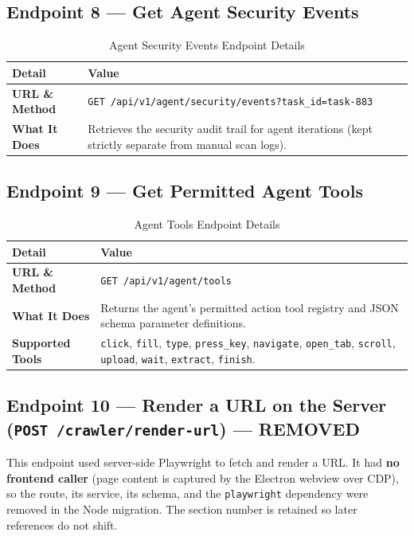 \documentclass[11pt,a4paper]{article}
\begin{document}
\subsection{Endpoint 8 --- Get Agent Security Events}
\begin{table}[H]
\centering
\small
\begin{tabularx}{\textwidth}{BX}
\toprule
\textbf{Detail} & \textbf{Value} \\
\midrule
\textbf{URL \& Method} & \texttt{GET /api/v1/agent/security/events?task\_id=task-883} \\
\textbf{What It Does} & Retrieves the security audit trail for agent iterations (kept strictly separate from manual scan logs). \\
\bottomrule
\end{tabularx}
\caption{Agent Security Events Endpoint Details}
\end{table}

\subsection{Endpoint 9 --- Get Permitted Agent Tools}
\begin{table}[H]
\centering
\small
\begin{tabularx}{\textwidth}{BX}
\toprule
\textbf{Detail} & \textbf{Value} \\
\midrule
\textbf{URL \& Method} & \texttt{GET /api/v1/agent/tools} \\
\textbf{What It Does} & Returns the agent's permitted action tool registry and JSON schema parameter definitions. \\
\textbf{Supported Tools} & \texttt{click}, \texttt{fill}, \texttt{type}, \texttt{press\_key}, \texttt{navigate}, \texttt{open\_tab}, \texttt{scroll}, \texttt{upload}, \texttt{wait}, \texttt{extract}, \texttt{finish}. \\
\bottomrule
\end{tabularx}
\caption{Agent Tools Endpoint Details}
\end{table}

\subsection{Endpoint 10 --- Render a URL on the Server (\texttt{POST /crawler/render-url}) --- REMOVED}
This endpoint used server-side Playwright to fetch and render a URL. It had \textbf{no frontend caller} (page content is captured by the Electron webview over CDP), so the route, its service, its schema, and the \texttt{playwright} dependency were removed in the Node migration. The section number is retained so later references do not shift.
\end{document}
